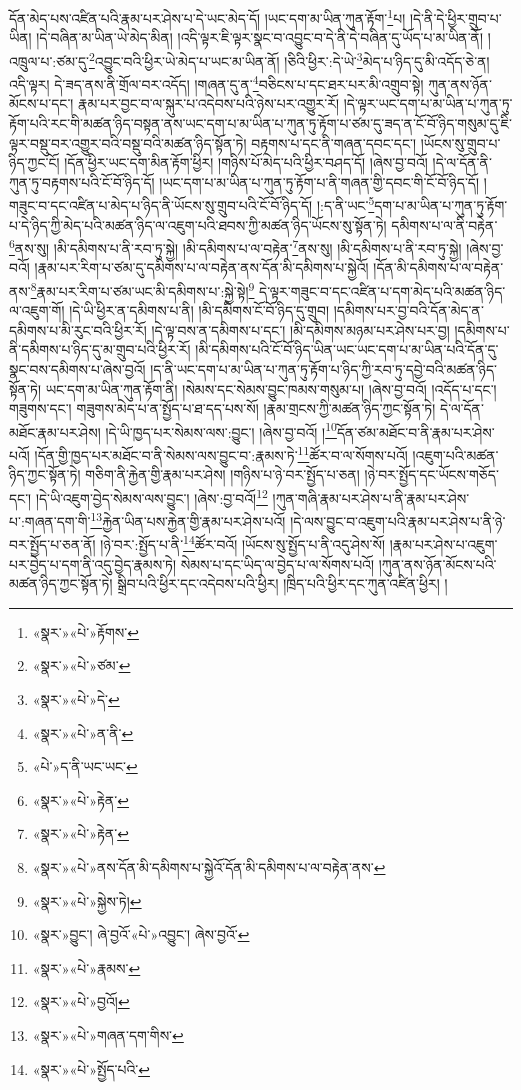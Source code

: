 དོན་མེད་པས་འཛིན་པའི་རྣམ་པར་ཤེས་པ་དེ་ཡང་མེད་དོ། །ཡང་དག་མ་ཡིན་ཀུན་རྟོག་\footnote{«སྣར་»«པེ་»རྟོགས་}པ། །དེ་ནི་དེ་ཕྱིར་གྲུབ་པ་ཡིན། །དེ་བཞིན་མ་ཡིན་ཡེ་མེད་མིན། །འདི་ལྟར་ཇི་ལྟར་སྣང་བ་འབྱུང་བ་དེ་ནི་དེ་བཞིན་དུ་ཡོད་པ་མ་ཡིན་ནོ། །འཁྲུལ་པ་:ཙམ་དུ་\footnote{«སྣར་»«པེ་»ཙམ་}འབྱུང་བའི་ཕྱིར་ཡེ་མེད་པ་ཡང་མ་ཡིན་ནོ། །ཅིའི་ཕྱིར་:དེ་ཡེ་\footnote{«སྣར་»«པེ་»དེ་}མེད་པ་ཉིད་དུ་མི་འདོད་ཅེ་ན། འདི་ལྟར། དེ་ཟད་ནས་ནི་གྲོལ་བར་འདོད། །གཞན་དུ་ན་\footnote{«སྣར་»«པེ་»ན་ནི་}བཅིངས་པ་དང་ཐར་པར་མི་འགྲུབ་སྟེ། ཀུན་ནས་ཉོན་མོངས་པ་དང་། རྣམ་པར་བྱང་བ་ལ་སྐུར་པ་འདེབས་པའི་ཉེས་པར་འགྱུར་རོ། །དེ་ལྟར་ཡང་དག་པ་མ་ཡིན་པ་ཀུན་ཏུ་རྟོག་པའི་རང་གི་མཚན་ཉིད་བསྟན་ནས་ཡང་དག་པ་མ་ཡིན་པ་ཀུན་ཏུ་རྟོག་པ་ཙམ་དུ་ཟད་ན་ངོ་བོ་ཉིད་གསུམ་དུ་ཇི་ལྟར་བསྡུ་བར་འགྱུར་བའི་བསྡུ་བའི་མཚན་ཉིད་སྟོན་ཏེ། བརྟགས་པ་དང་ནི་གཞན་དབང་དང་། །ཡོངས་སུ་གྲུབ་པ་ཉིད་ཀྱང་ངོ། །དོན་ཕྱིར་ཡང་དག་མིན་རྟོག་ཕྱིར། །གཉིས་པོ་མེད་པའི་ཕྱིར་བཤད་དོ། །ཞེས་བྱ་བའོ། །དེ་ལ་དོན་ནི་ཀུན་ཏུ་བརྟགས་པའི་ངོ་བོ་ཉིད་དོ། །ཡང་དག་པ་མ་ཡིན་པ་ཀུན་ཏུ་རྟོག་པ་ནི་གཞན་གྱི་དབང་གི་ངོ་བོ་ཉིད་དོ། །གཟུང་བ་དང་འཛིན་པ་མེད་པ་ཉིད་ནི་ཡོངས་སུ་གྲུབ་པའི་ངོ་བོ་ཉིད་དོ། །:ད་ནི་ཡང་\footnote{«པེ་»ད་ནི་ཡང་ཡང་}དག་པ་མ་ཡིན་པ་ཀུན་ཏུ་རྟོག་པ་དེ་ཉིད་ཀྱི་མེད་པའི་མཚན་ཉིད་ལ་འཇུག་པའི་ཐབས་ཀྱི་མཚན་ཉིད་ཡོངས་སུ་སྟོན་ཏེ། དམིགས་པ་ལ་ནི་བརྟེན་\footnote{«སྣར་»«པེ་»རྟེན་}ནས་སུ། །མི་དམིགས་པ་ནི་རབ་ཏུ་སྐྱེ། །མི་དམིགས་པ་ལ་བརྟེན་\footnote{«སྣར་»«པེ་»རྟེན་}ནས་སུ། །མི་དམིགས་པ་ནི་རབ་ཏུ་སྐྱེ། །ཞེས་བྱ་བའོ། །རྣམ་པར་རིག་པ་ཙམ་དུ་དམིགས་པ་ལ་བརྟེན་ནས་དོན་མི་དམིགས་པ་སྐྱེའོ། །དོན་མི་དམིགས་པ་ལ་བརྟེན་ནས་\footnote{«སྣར་»«པེ་»ནས་དོན་མི་དམིགས་པ་སྐྱེའོ་དོན་མི་དམིགས་པ་ལ་བརྟེན་ནས་}རྣམ་པར་རིག་པ་ཙམ་ཡང་མི་དམིགས་པ་:སྐྱེ་སྟེ།\footnote{«སྣར་»«པེ་»སྐྱེས་ཏེ།} དེ་ལྟར་གཟུང་བ་དང་འཛིན་པ་དག་མེད་པའི་མཚན་ཉིད་ལ་འཇུག་གོ། །དེ་ཡི་ཕྱིར་ན་དམིགས་པ་ནི། །མི་དམིགས་ངོ་བོ་ཉིད་དུ་གྲུབ། །དམིགས་པར་བྱ་བའི་དོན་མེད་ན་དམིགས་པ་མི་རུང་བའི་ཕྱིར་རོ། །དེ་ལྟ་བས་ན་དམིགས་པ་དང་། །མི་དམིགས་མཉམ་པར་ཤེས་པར་བྱ། །དམིགས་པ་ནི་དམིགས་པ་ཉིད་དུ་མ་གྲུབ་པའི་ཕྱིར་རོ། །མི་དམིགས་པའི་ངོ་བོ་ཉིད་ཡིན་ཡང་ཡང་དག་པ་མ་ཡིན་པའི་དོན་དུ་སྣང་བས་དམིགས་པ་ཞེས་བྱའོ། །ད་ནི་ཡང་དག་པ་མ་ཡིན་པ་ཀུན་ཏུ་རྟོག་པ་ཉིད་ཀྱི་རབ་ཏུ་དབྱེ་བའི་མཚན་ཉིད་སྟོན་ཏེ། ཡང་དག་མ་ཡིན་ཀུན་རྟོག་ནི། །སེམས་དང་སེམས་བྱུང་ཁམས་གསུམ་པ། །ཞེས་བྱ་བའོ། །འདོད་པ་དང་། གཟུགས་དང་། གཟུགས་མེད་པ་ན་སྤྱོད་པ་ཐ་དད་པས་སོ། །རྣམ་གྲངས་ཀྱི་མཚན་ཉིད་ཀྱང་སྟོན་ཏེ། དེ་ལ་དོན་མཐོང་རྣམ་པར་ཤེས། །དེ་ཡི་ཁྱད་པར་སེམས་ལས་:བྱུང་། །ཞེས་བྱ་བའོ། །\footnote{«སྣར་»བྱུང་། ཞེ་བྱའོ་«པེ་»འབྱུང་། ཞེས་བྱའོ་}དོན་ཙམ་མཐོང་བ་ནི་རྣམ་པར་ཤེས་པའོ། །དོན་གྱི་ཁྱད་པར་མཐོང་བ་ནི་སེམས་ལས་བྱུང་བ་:རྣམས་ཏེ་\footnote{«སྣར་»«པེ་»རྣམས་}ཚོར་བ་ལ་སོགས་པའོ། །འཇུག་པའི་མཚན་ཉིད་ཀྱང་སྟོན་ཏེ། གཅིག་ནི་རྐྱེན་གྱི་རྣམ་པར་ཤེས། །གཉིས་པ་ཉེ་བར་སྤྱོད་པ་ཅན། །ཉེ་བར་སྤྱོད་དང་ཡོངས་གཅོད་དང་། །དེ་ཡི་འཇུག་བྱེད་སེམས་ལས་བྱུང་། །ཞེས་:བྱ་བའོ།\footnote{«སྣར་»«པེ་»བྱའོ།} །ཀུན་གཞི་རྣམ་པར་ཤེས་པ་ནི་རྣམ་པར་ཤེས་པ་:གཞན་དག་གི་\footnote{«སྣར་»«པེ་»གཞན་དག་གིས་}རྐྱེན་ཡིན་པས་རྐྱེན་གྱི་རྣམ་པར་ཤེས་པའོ། །དེ་ལས་བྱུང་བ་འཇུག་པའི་རྣམ་པར་ཤེས་པ་ནི་ཉེ་བར་སྤྱོད་པ་ཅན་ནོ། །ཉེ་བར་:སྤྱོད་པ་ནི་\footnote{«སྣར་»«པེ་»སྤྱོད་པའི་}ཚོར་བའོ། །ཡོངས་སུ་སྤྱོད་པ་ནི་འདུ་ཤེས་སོ། །རྣམ་པར་ཤེས་པ་འཇུག་པར་བྱེད་པ་དག་ནི་འདུ་བྱེད་རྣམས་ཏེ། སེམས་པ་དང་ཡིད་ལ་བྱེད་པ་ལ་སོགས་པའོ། །ཀུན་ནས་ཉོན་མོངས་པའི་མཚན་ཉིད་ཀྱང་སྟོན་ཏེ། སྒྲིབ་པའི་ཕྱིར་དང་འདེབས་པའི་ཕྱིར། །ཁྲིད་པའི་ཕྱིར་དང་ཀུན་འཛིན་ཕྱིར། །
